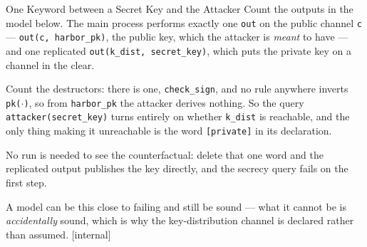 \documentclass[11pt,a4paper]{article}
\theoremstyle{definition}
\begin{document}
\begin{pdexample}{One Keyword between a Secret Key and the Attacker}
\setlength{\parskip}{4pt plus 1pt}
Count the outputs in the model below. The main process performs exactly one
\texttt{out} on the public channel \texttt{c} --- \texttt{out(c, harbor\_pk)},
the public key, which the attacker is \emph{meant} to have --- and one
replicated \texttt{out(k\_dist, secret\_key)}, which puts the private key on a
channel in the clear.

Count the destructors: there is one,
\texttt{check\_sign}, and no rule anywhere inverts \texttt{pk($\cdot$)}, so
from \texttt{harbor\_pk} the attacker derives nothing. So the query
\texttt{attacker(secret\_key)} turns entirely on whether \texttt{k\_dist} is
reachable, and the only thing making it unreachable is the word
\texttt{[private]} in its declaration.

No run is needed to see the
counterfactual: delete that one word and the replicated output publishes the
key directly, and the secrecy query fails on the first step.

A model can be
this close to failing and still be sound --- what it cannot be is
\emph{accidentally} sound, which is why the key-distribution channel is
declared rather than assumed. [internal]
\end{pdexample}
\end{document}
